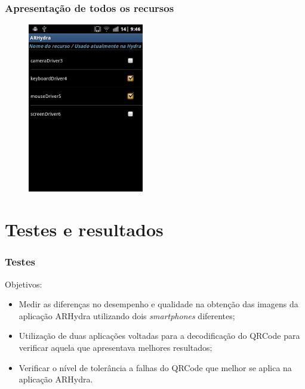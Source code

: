 \documentclass{beamer}
\begin{document}
	\begin{frame}
		\frametitle{Apresentação de todos os recursos}
		\begin{figure}[htb]
			\begin{center}
				\includegraphics[width=0.45\textwidth]{figuras/listagem_recursos.png}
			\end{center}
		\end{figure}
	\end{frame}
	
	
	

\section{Testes e resultados}

	\begin{frame}
		\frametitle{Testes}
		
		Objetivos:
		\begin{itemize}
			\item	Medir as diferenças no desempenho e qualidade na obtenção das imagens 
					da aplicação ARHydra utilizando dois \emph{smartphones}	diferentes;  
			\item 	Utilização de duas aplicações voltadas para a decodificação do QRCode
					para verificar aquela que apresentava melhores resultados; 	
			\item 	Verificar o nível de tolerância a falhas do QRCode que melhor se aplica
					na aplicação ARHydra.  	
		\end{itemize}
	\end{frame}	
\end{document}
